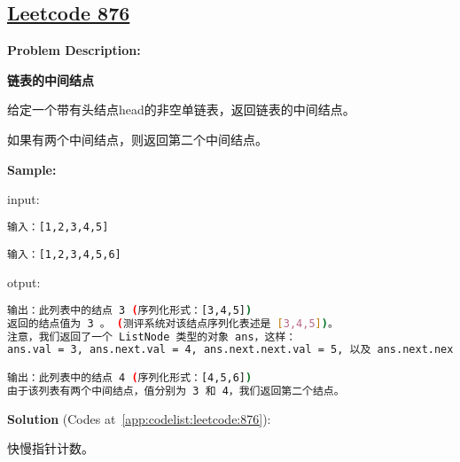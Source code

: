 \subsection{\href{https://leetcode-cn.com/}{Leetcode 876}}\label{app:problemlist:leetcode:876}

\textbf{Problem Description:}\par

\textbf{链表的中间结点}\par

给定一个带有头结点head的非空单链表，返回链表的中间结点。\par

如果有两个中间结点，则返回第二个中间结点。\par


\textbf{Sample:}\par

input:\par

\begin{lstlisting}[language=bash]
输入：[1,2,3,4,5]

输入：[1,2,3,4,5,6]
\end{lstlisting}

otput:\par

\begin{lstlisting}[language=bash]
输出：此列表中的结点 3 (序列化形式：[3,4,5])
返回的结点值为 3 。 (测评系统对该结点序列化表述是 [3,4,5])。
注意，我们返回了一个 ListNode 类型的对象 ans，这样：
ans.val = 3, ans.next.val = 4, ans.next.next.val = 5, 以及 ans.next.next.next = NULL.

输出：此列表中的结点 4 (序列化形式：[4,5,6])
由于该列表有两个中间结点，值分别为 3 和 4，我们返回第二个结点。
\end{lstlisting}

\textbf{Solution }(Codes at~\ref{app:codelist:leetcode:876}):\par

快慢指针计数。\par




